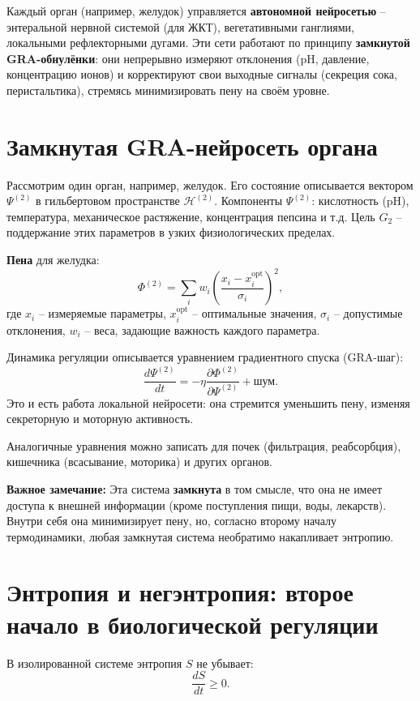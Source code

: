 \documentclass[12pt,a4paper]{article}
\begin{document}
Каждый орган (например, желудок) управляется \textbf{автономной нейросетью} – энтеральной нервной системой (для ЖКТ), вегетативными ганглиями, локальными рефлекторными дугами. Эти сети работают по принципу \textbf{замкнутой GRA-обнулёнки}: они непрерывно измеряют отклонения (pH, давление, концентрацию ионов) и корректируют свои выходные сигналы (секреция сока, перистальтика), стремясь минимизировать пену на своём уровне.

\section{Замкнутая GRA-нейросеть органа}

Рассмотрим один орган, например, желудок. Его состояние описывается вектором \(\Psi^{(2)}\) в гильбертовом пространстве \(\mathcal{H}^{(2)}\). Компоненты \(\Psi^{(2)}\): кислотность (pH), температура, механическое растяжение, концентрация пепсина и т.д. Цель \(G_2\) – поддержание этих параметров в узких физиологических пределах.

\textbf{Пена} для желудка:
\[
\Phi^{(2)} = \sum_{i} w_i \left( \frac{x_i - x_i^{\text{opt}}}{\sigma_i} \right)^2,
\]
где \(x_i\) – измеряемые параметры, \(x_i^{\text{opt}}\) – оптимальные значения, \(\sigma_i\) – допустимые отклонения, \(w_i\) – веса, задающие важность каждого параметра.

Динамика регуляции описывается уравнением градиентного спуска (GRA-шаг):
\[
\frac{d\Psi^{(2)}}{dt} = -\eta \frac{\partial \Phi^{(2)}}{\partial \Psi^{(2)}} + \text{шум}.
\]
Это и есть работа локальной нейросети: она стремится уменьшить пену, изменяя секреторную и моторную активность.

Аналогичные уравнения можно записать для почек (фильтрация, реабсорбция), кишечника (всасывание, моторика) и других органов.

\textbf{Важное замечание:} Эта система \textbf{замкнута} в том смысле, что она не имеет доступа к внешней информации (кроме поступления пищи, воды, лекарств). Внутри себя она минимизирует пену, но, согласно второму началу термодинамики, любая замкнутая система необратимо накапливает энтропию.

\section{Энтропия и негэнтропия: второе начало в биологической регуляции}

В изолированной системе энтропия \(S\) не убывает:
\[
\frac{dS}{dt} \ge 0.
\]
\end{document}
